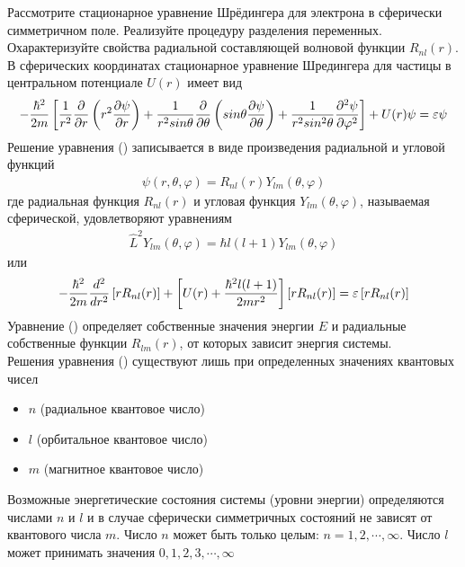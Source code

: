 \documentclass[__main__.tex]{subfiles}
\begin{document}
Рассмотрите стационарное уравнение Шрёдингера для электрона в сферически симметричном поле. Реализуйте процедуру разделения переменных. Охарактеризуйте свойства радиальной составляющей волновой функции $R_{nl}(r)$.\\

В сферических координатах стационарное уравнение Шредингера для частицы в центральном потенциале $U(r)$ имеет вид
\begin{gather}
    \llabel{k39-1}
    -\frac{\hbar^2}{2m}\left[\frac{1}{r^2}\frac{\partial}{\partial r}\left(r^2\frac{\partial \psi}{\partial r}\right)+\frac{1}{r^2sin\theta}\frac{\partial}{\partial\theta}\left(sin\theta\frac{\partial \psi}{\partial \theta}\right)+\frac{1}{r^2sin^2\theta}\frac{\partial^2\psi}{\partial \varphi^2}\right]+U(r)\psi = \varepsilon\psi
\end{gather}
Решение уравнения () записывается в виде произведения радиальной и угловой функций
\begin{gather*}
    \psi(r,\theta,\varphi)=R_{nl}(r)Y_{lm}(\theta,\varphi)
\end{gather*}
где радиальная функция $R_{nl}(r)$ и угловая функция $Y_{lm}(\theta,\varphi)$, называемая сферической, удовлетворяют уравнениям
\begin{gather*}
    \hat{L}^2Y_{lm}(\theta,\varphi) = \hbar l(l+1)Y_{lm}(\theta,\varphi)
\end{gather*}
или
\begin{gather}
    \llabel{k39-2}
    -\frac{\hbar^2}{2m}\frac{d^2}{dr^2}\left[rR_{nl}(r)\right]+\left[U(r)+\frac{\hbar^2 l(l+1)}{2mr^2}\right]\left[r R_{nl}(r)\right] = \varepsilon\left[rR_{nl}(r)\right]
\end{gather}
Уравнение () определяет собственные значения энергии $E$ и радиальные собственные функции $R_{lm}(r)$, от которых зависит энергия системы.\\
Решения уравнения () существуют лишь при определенных значениях квантовых чисел
\begin{itemize}
    \item $n$ (радиальное квантовое число)
    \item $l$ (орбитальное квантовое число)
    \item $m$ (магнитное квантовое число)
\end{itemize}
Возможные энергетические состояния системы (уровни энергии) определяются числами $n$ и $l$ и в случае сферически симметричных состояний не зависят от квантового числа $m$. Число $n$ может быть только целым: $n=1,2,\cdots,\infty$. Число $l$ может принимать значения $0,1,2,3,\cdots,\infty$
\end{document}
